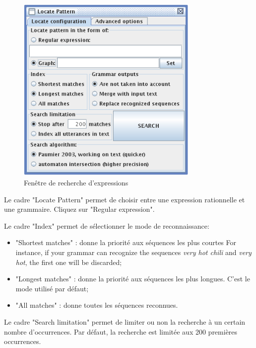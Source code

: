 \bigskip
\begin{figure}[h]
\begin{center}
\includegraphics[width=8.8cm]{resources/img/fig4-4.png}
\caption{Fenêtre de recherche d’expressions\label{fig-regexp-search-configuration}}
\end{center}
\end{figure}

\noindent Le cadre "Locate Pattern" permet de choisir entre une expression rationnelle et une
grammaire. Cliquez sur "Regular expression".


\bigskip
\noindent Le cadre "Index" permet de sélectionner le mode de reconnaissance:

\bigskip
{}
\begin{itemize}
  \item "Shortest matches" : donne la priorité aux séquences les plus courtes
  	  For instance, if your grammar can recognize the sequences \textit{very hot chili} and 
  \textit{very hot}, the first one will be discarded;
  \item "Longest matches" : donne la priorité aux séquences les plus longues. C’est le mode utilisé
  	  par défaut;
  \item "All matches" : donne toutes les séquences reconnues.
\end{itemize}

\bigskip
\noindent Le cadre "Search limitation" permet de limiter ou non la recherche à un certain nombre
d’occurrences. Par défaut, la recherche est limitée aux 200 premières occurrences.

